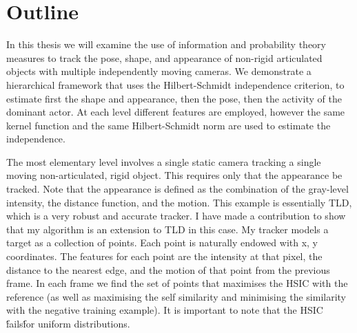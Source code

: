 \chapter{Outline}
\label{outline}

\citet{campbell16}

In this thesis we will examine the use of information and probability theory measures to track the pose, shape, and appearance of non-rigid articulated objects with multiple independently moving cameras. We demonstrate a hierarchical framework that uses the Hilbert-Schmidt independence criterion, to estimate first the shape and appearance, then the pose, then the activity of the dominant actor. At each level different features are employed, however the same kernel function and the same Hilbert-Schmidt norm are used to estimate the independence. 

The most elementary level involves a single static camera tracking a single moving non-articulated, rigid object. This requires only that the appearance be tracked. Note that the appearance is defined as the combination of the gray-level intensity, the distance function, and the motion. This example is essentially TLD, which is a very robust and accurate tracker. I have made a contribution to show that my algorithm is an extension to TLD in this case. My tracker models a target as a collection of points. Each point is naturally endowed with x, y coordinates. The features for each point are the intensity at that pixel, the distance to the nearest edge, and the motion of that point from the previous frame. In each frame we find the set of points that maximises the HSIC with the reference (as well as maximising the self similarity and minimising the similarity with the negative training example). It is important to note that the HSIC \'fails\' for uniform distributions.

